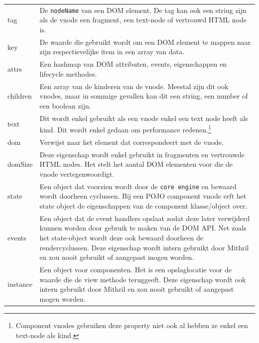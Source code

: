 \begin{table}[!htbp]
    \begin{tabular}{p{} p{}}
        tag      & De \texttt{nodeName} van een DOM element. De tag kan ook een string zijn als de vnode een fragment, een text-node of vertrouwd HTML node is.                                                                                     \\
        key      & De waarde die gebruikt wordt om een DOM element te mappen naar zijn respectievelijke item in een array van data.                                                                                                                 \\
        attrs    & Een hashmap van DOM attributen, events, eigenschappen en lifecycle methodes.                                                                                                                                                     \\
        children & Een array van de kinderen van de vnode. Meestal zijn dit ook vnodes, maar in sommige gevallen kan dit een string, een number of een boolean zijn.                                                                                \\
        text     & Dit wordt enkel gebruikt als een vnode enkel een text node heeft als kind. Dit wordt enkel gedaan om performance redenen.\footnote{Component vnodes gebruiken deze property niet ook al hebben ze enkel een text-node als kind.} \\
        dom      & Verwijst naar het element dat correspondeert met de vnode.                                                                                                                                                                       \\
        domSize  & Deze eigenschap wordt enkel gebruikt in fragmenten en vertrouwde HTML nodes. Het stelt het aantal DOM elementen voor die de vnode vertegenwoordigt. \\
        state & Een object dat voorzien wordt door de \texttt{core engine} en bewaard wordt doorheen cyclussen. Bij een POJO component vnode erft het state object de eigenschappen van de component klasse/object over. \\
        events & Een object dat de event handlers opslaat zodat deze later verwijderd kunnen worden door gebruik te maken van de DOM API. Net zoals het state-object wordt deze ook bewaard doorheen de rendercyclussen. Deze eigenschap wordt intern gebruikt door Mithril en zou nooit gebruikt of aangepast mogen worden. \\
        instance & Een object voor componenten. Het is een opslaglocatie voor de waarde die de view methode teruggeeft. Deze eigenschap wordt ook intern gebruikt door Mithril en zou nooit gebruikt of aangepast mogen worden. \\
    \end{tabular}
\end{table} \autocite{Mithril2019g}

